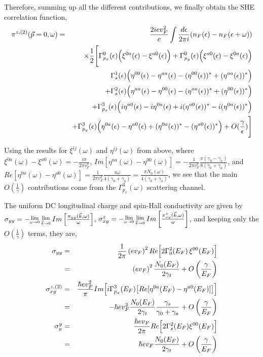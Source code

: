 \documentclass[letter,12pt,preprint,aps]{revtex4-1}
\newcommand{\ba}{\begin{eqnarray}}
\newcommand{\ea}{\end{eqnarray}}
\newcommand{\bl}{\left (}
\newcommand{\br}{\right )}
\newcommand{\Lim}[1]{\raisebox{0.5ex}{\scalebox{0.8}{$\displaystyle \lim_{#1}\;$}}}
\begin{document}
Therefore, summing up all the different contributions, we finally obtain the SHE correlation function,
%
\ba
\label{eqn: Piz2xy result}
\pi^{z, (2)}(\vec{p} =0, \omega) & = & \frac{2 i e v_F^2}{c} \int \frac{d \epsilon}{2 \pi i} (n_F(\epsilon) - n_F(\epsilon + \omega)) \cr
 & & \times \frac{1}{2} \Bigg[ \Gamma^0_{p_x}(\epsilon) \Big( \xi^{0a}(\epsilon) - \xi^{a0}(\epsilon) \Big) + \Gamma^0_{p_y}(\epsilon) \Big( \xi^{a0}(\epsilon) - \xi^{0a}(\epsilon) \Big) \cr
 & & \Gamma^1_s(\epsilon) \Big( \eta^{00}(\epsilon) - \eta^{aa}(\epsilon) - (\eta^{00}(\epsilon))^* + (\eta^{aa}(\epsilon))^* \Big) \cr
 & & + \Gamma^2_s(\epsilon) \Big( \eta^{aa}(\epsilon) - \eta^{00}(\epsilon) - (\eta^{aa}(\epsilon))^* + (\eta^{00}(\epsilon))^*  \Big) \cr
 & & + \Gamma^3_{p_x}(\epsilon) \Big( i \eta^{a0}(\epsilon) - i \eta^{0a}(\epsilon) + i (\eta^{a0}(\epsilon))^* - i (\eta^{0a}(\epsilon))^* \Big) \cr
 & & + \Gamma^3_{p_y}(\epsilon) \Big( \eta^{0a}(\epsilon) - \eta^{a0}(\epsilon) + (\eta^{0a}(\epsilon))^* - (\eta^{a0}(\epsilon))^* \Big) + O(\frac{\gamma}{\epsilon}) \Bigg] 
\ea

Using the results for $\xi^{ij}(\omega)$ and $\eta^{ij}(\omega)$ from above, where $\xi^{0a}(\omega) - \xi^{a0}(\omega) = - \tfrac{i \pi}{2 \pi v_F^2}$, $Im[ \eta^{aa}(\omega)- \eta^{00}(\omega)] = - \tfrac{1}{2 \pi v_F^2} \tfrac{\pi (\gamma_0 - \gamma_a)}{8 (\gamma_0 + \gamma_a)}$, and $Re[\eta^{0a}(\omega) - \eta^{a0}(\omega)] = \tfrac{1}{2 \pi v_F^2} \tfrac{\pi \omega}{4 (\gamma_0 + \gamma_a)} = \tfrac{\pi N_0(\omega)}{4 (\gamma_0 + \gamma_a)}$, we see that the main $O(\tfrac{1}{\gamma})$ contributions come from the $\Gamma^3_{p_x}(\omega)$ scattering channel.

The uniform DC longitudinal charge and spin-Hall conductivity are given by $\sigma_{yy} = - \Lim{\omega \rightarrow 0} \Lim{\vec{k} \rightarrow 0} Im \left[ \frac{\pi_{yy}(\vec{k}, \omega)}{\omega} \right]$, $\sigma^{z}_{xy} = -\Lim{\omega \rightarrow 0} \Lim{\vec{k} \rightarrow 0} Im \left[ \frac{\pi^{z}_{xy}(\vec{k}, \omega)}{\omega} \right]$, and keeping only the $O(\tfrac{1}{\gamma})$ terms, they are,
%
\ba
\label{eqn: spin charge conductivities}
\sigma_{yy} & = & \frac{1}{2 \pi} \bl e v_F \br^2 Re \Big[ 2 \Gamma^2_0(E_F) \, \xi^{00}(E_F) \Big] \cr
 & = & \bl e v_F \br^2 \frac{N_0(E_F)}{2 \gamma_t} + O \bl \frac{\gamma}{E_F} \br \\
\sigma^{z, (2)}_{xy} & = &  \frac{\hbar e v_F^2}{\pi} Im \Big[ i \Gamma^3_{p_x}(E_F) \big[ Re[ \eta^{0a}(E_F) - \eta^{a0}(E_F)] \big] \Big] \cr
 & = & - \hbar e v_F^2 \frac{N_0(E_F)}{2 \gamma_t} \frac{\gamma_{s}}{\gamma_0 + \gamma_a} + O \bl \frac{\gamma}{E_F} \br  \\
\sigma^y_y & = & \frac{\hbar e v_F}{2 \pi} Re \Big[ 2 \Gamma^2_s(E_F) \xi^{00}(E_F) \Big]\cr
 & = & \hbar e v_F \frac{N_0(E_F)}{2 \gamma_t} + O \bl \frac{\gamma}{E_F} \br 
\ea
\end{document}
